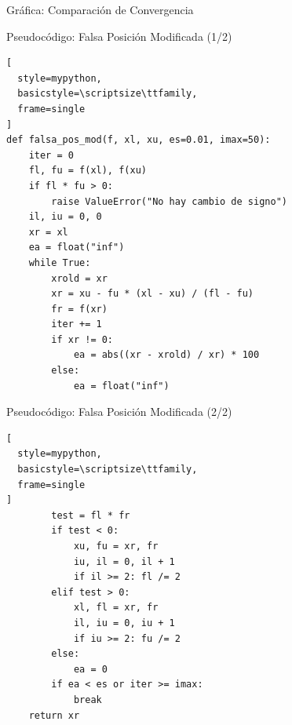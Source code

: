\documentclass[../../main.tex]{subfiles}
\begin{document}
\begin{frame}{Gráfica: Comparación de Convergencia}
\end{frame}

\begin{frame}[fragile]{Pseudocódigo: Falsa Posición Modificada (1/2)}
\begin{lstlisting}[
  style=mypython,
  basicstyle=\scriptsize\ttfamily,
  frame=single
]
def falsa_pos_mod(f, xl, xu, es=0.01, imax=50):
    iter = 0
    fl, fu = f(xl), f(xu)
    if fl * fu > 0:
        raise ValueError("No hay cambio de signo")
    il, iu = 0, 0
    xr = xl
    ea = float("inf")
    while True:
        xrold = xr
        xr = xu - fu * (xl - xu) / (fl - fu)
        fr = f(xr)
        iter += 1
        if xr != 0:
            ea = abs((xr - xrold) / xr) * 100
        else:
            ea = float("inf")
\end{lstlisting}
\end{frame}

\begin{frame}[fragile]{Pseudocódigo: Falsa Posición Modificada (2/2)}
\begin{lstlisting}[
  style=mypython,
  basicstyle=\scriptsize\ttfamily,
  frame=single
]
        test = fl * fr
        if test < 0:
            xu, fu = xr, fr
            iu, il = 0, il + 1
            if il >= 2: fl /= 2
        elif test > 0:
            xl, fl = xr, fr
            il, iu = 0, iu + 1
            if iu >= 2: fu /= 2
        else:
            ea = 0
        if ea < es or iter >= imax:
            break
    return xr
\end{lstlisting}
\end{frame}
\end{document}
